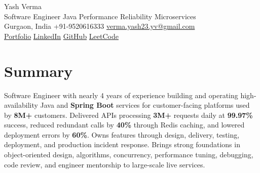 \documentclass[letterpaper,11pt]{article}
\begin{document}
\begin{center}
  {\Huge Yash Verma} \\
  \small Software Engineer \textperiodcentered{} Java \textperiodcentered{} Performance \textperiodcentered{} Reliability \textperiodcentered{} Microservices \\
  \vspace{5pt}
  \small Gurgaon, India \textbar{} +91-9520616333 \textbar{}
  \href{mailto:verma.yash23.yv@gmail.com}{verma.yash23.yv@gmail.com} \\
  \vspace{7pt}
  \href{https://yashverma230600.github.io/yash-portfolio/}{Portfolio} \textbar{}
  \href{https://www.linkedin.com/in/yash-verma-9243a7193/}{LinkedIn} \textbar{}
  \href{https://github.com/yashverma230600}{GitHub} \textbar{}
  \href{https://leetcode.com/yashverma230600}{LeetCode}
  \vspace{-8pt}
\end{center}

\section{Summary}
\begin{itemize}[leftmargin=0.15in, label={}]
  \small{\item{
    Software Engineer with nearly 4 years of experience building and operating high-availability Java and \textbf{Spring Boot} services for customer-facing platforms used by \textbf{8M+} customers. Delivered APIs processing \textbf{3M+} requests daily at \textbf{99.97\%} success, reduced redundant calls by \textbf{40\%} through Redis caching, and lowered deployment errors by \textbf{60\%}. Owns features through design, delivery, testing, deployment, and production incident response. Brings strong foundations in object-oriented design, algorithms, concurrency, performance tuning, debugging, code review, and engineer mentorship to large-scale live services.
  }}
\end{itemize}
\vspace{-8pt}

\end{document}
